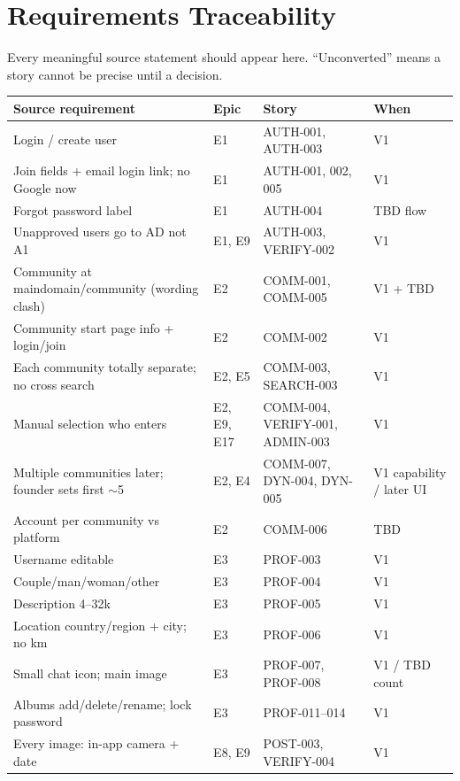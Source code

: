 \documentclass[11pt,a4paper]{article}
\begin{document}
\section{Requirements Traceability}
Every meaningful source statement should appear here. ``Unconverted'' means a story cannot be precise until a decision.

\begin{longtable}{@{}p{5.8cm}p{2.0cm}p{3.4cm}p{2.4cm}@{}}
\toprule
\textbf{Source requirement} & \textbf{Epic} & \textbf{Story} & \textbf{When} \\
\midrule
\endhead
Login / create user & E1 & AUTH-001, AUTH-003 & V1 \\
Join fields + email login link; no Google now & E1 & AUTH-001, 002, 005 & V1 \\
Forgot password label & E1 & AUTH-004 & TBD flow \\
Unapproved users go to AD not A1 & E1, E9 & AUTH-003, VERIFY-002 & V1 \\
Community at maindomain/community (wording clash) & E2 & COMM-001, COMM-005 & V1 + TBD \\
Community start page info + login/join & E2 & COMM-002 & V1 \\
Each community totally separate; no cross search & E2, E5 & COMM-003, SEARCH-003 & V1 \\
Manual selection who enters & E2, E9, E17 & COMM-004, VERIFY-001, ADMIN-003 & V1 \\
Multiple communities later; founder sets first $\sim$5 & E2, E4 & COMM-007, DYN-004, DYN-005 & V1 capability / later UI \\
Account per community vs platform & E2 & COMM-006 & TBD \\
Username editable & E3 & PROF-003 & V1 \\
Couple/man/woman/other & E3 & PROF-004 & V1 \\
Description 4--32k & E3 & PROF-005 & V1 \\
Location country/region + city; no km & E3 & PROF-006 & V1 \\
Small chat icon; main image & E3 & PROF-007, PROF-008 & V1 / TBD count \\
Albums add/delete/rename; lock password & E3 & PROF-011--014 & V1 \\
Every image: in-app camera + date & E8, E9 & POST-003, VERIFY-004 & V1 \\

\end{longtable}
\end{document}
